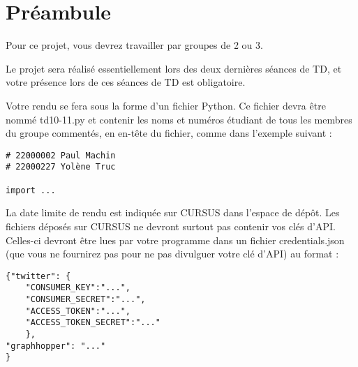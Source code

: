 \documentclass[11pt,a4paper]{article}
\begin{document}
\section{Préambule}

Pour ce projet, vous devrez travailler par groupes de 2 ou 3.

Le projet sera réalisé essentiellement lors des deux dernières séances de TD, et votre présence lors de ces séances de TD est obligatoire.

Votre rendu se fera sous la forme d’un
fichier Python. Ce fichier devra être nommé td10-11.py et contenir les noms et numéros étudiant de tous
les membres du groupe commentés, en en-tête du fichier, comme dans l’exemple suivant :
\begin{verbatim}
# 22000002 Paul Machin
# 22000227 Yolène Truc

import ...
\end{verbatim}

La date limite de rendu est indiquée sur CURSUS dans l’espace de dépôt. Les fichiers déposés sur
CURSUS ne devront surtout pas contenir vos clés d’API. Celles-ci devront être lues par votre
programme dans un fichier credentials.json (que vous ne fournirez pas pour ne pas divulguer
votre clé d’API) au format :
\begin{verbatim}
{"twitter": {
    "CONSUMER_KEY":"...",
    "CONSUMER_SECRET":"...",
    "ACCESS_TOKEN":"...",
    "ACCESS_TOKEN_SECRET":"..."
    },
"graphhopper": "..."
}
\end{verbatim}
\end{document}
